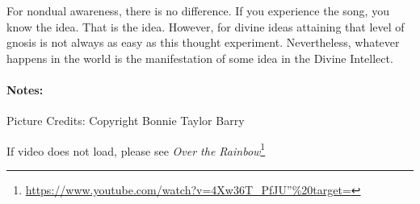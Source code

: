 For nondual awareness, there is no difference. If you experience the song, you know the idea. That is the idea. However, for divine ideas attaining that level of gnosis is not always as easy as this thought experiment. Nevertheless, whatever happens in the world is the manifestation of some idea in the Divine Intellect.

\paragraph{Notes:}


Picture Credits: Copyright Bonnie Taylor Barry

If video does not load, please see \emph{Over the Rainbow}\footnote{\url{https://www.youtube.com/watch?v=4Xw36T\_PfJU”\%20target=}} 



